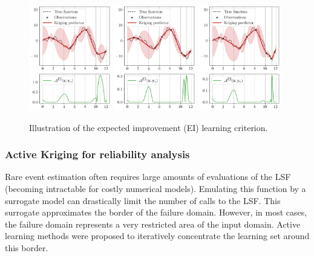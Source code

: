 \begin{figure}
    \centering
    \includegraphics[width=0.32\textwidth]{../numerical_experiments/chapter1/figures/bayesian_opt_0.png}
    \includegraphics[width=0.32\textwidth]{../numerical_experiments/chapter1/figures/bayesian_opt_1.png}
    \includegraphics[width=0.32\textwidth]{../numerical_experiments/chapter1/figures/bayesian_opt_2.png}
    \caption{Illustration of the expected improvement (EI) learning criterion.}
    \label{fig:EGO_1D}
\end{figure}

\subsubsection{Active Kriging for reliability analysis}
Rare event estimation often requires large amounts of evaluations of the LSF (becoming intractable for costly numerical models). 
Emulating this function by a surrogate model can drastically limit the number of calls to the LSF. 
This surrogate approximates the border of the failure domain. 
However, in most cases, the failure domain represents a very restricted area of the input domain. 
Active learning methods were proposed to iteratively concentrate the learning set around this border. 

